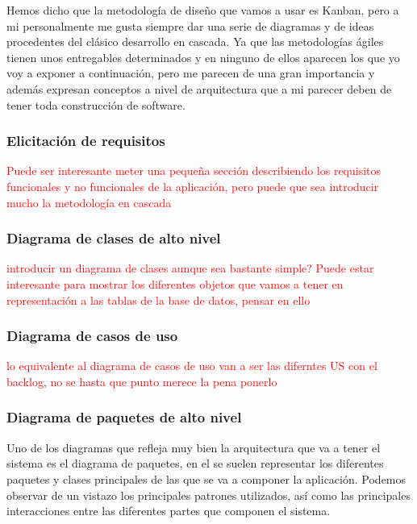 Hemos dicho que la metodología de diseño que vamos a usar es Kanban, pero a mi personalmente me gusta siempre dar una serie de diagramas y de ideas procedentes del clásico desarrollo en cascada. Ya que las metodologías ágiles tienen unos entregables determinados y en ninguno de ellos aparecen los que yo voy a exponer a continuación, pero me parecen de una gran importancia y además expresan conceptos a nivel de arquitectura que a mi parecer deben de tener toda construcción de software. 

\subsubsection*{Elicitación de requisitos}

\textcolor{red}{Puede ser interesante meter una pequeña sección describiendo los requisitos funcionales y no funcionales de la aplicación, pero puede que sea introducir mucho la metodología en cascada}

\subsubsection*{Diagrama de clases de alto nivel}

\textcolor{red}{introducir un diagrama de clases aunque sea bastante simple? Puede estar interesante para mostrar los diferentes objetos que vamos a tener en representación a las tablas de la base de datos, pensar en ello}

\subsubsection*{Diagrama de casos de uso}

\textcolor{red}{lo equivalente al diagrama de casos de uso van a ser las diferntes US con el backlog, no se hasta que punto merece la pena ponerlo}

\subsubsection*{Diagrama de paquetes de alto nivel}

Uno de los diagramas que refleja muy bien la arquitectura que va a tener el sistema es el diagrama de paquetes, en el se suelen representar los diferentes paquetes y clases principales de las que se va a componer la aplicación. Podemos observar de un vistazo los principales patrones utilizados, así como las principales interacciones entre las diferentes partes que componen el sistema. 


